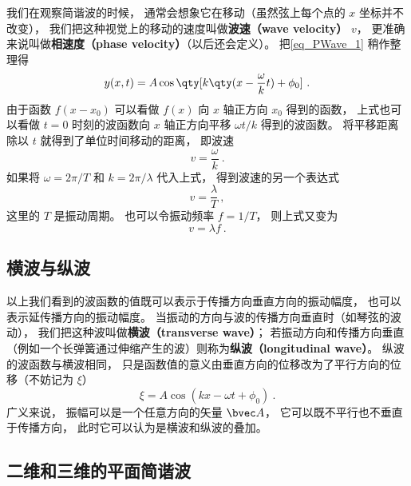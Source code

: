 我们在观察简谐波的时候， 通常会想象它在移动（虽然弦上每个点的 $x$ 坐标并不改变）， 我们把这种视觉上的移动的速度叫做\textbf{波速（wave velocity）} $v$， 更准确来说叫做\textbf{相速度（phase velocity）}（以后还会定义）。 把\autoref{eq_PWave_1} 稍作整理得
\begin{equation}
y(x, t) = A\cos \qty[k \qty(x - \frac{\omega}{k} t) + \phi_0]~.
\end{equation}
由于函数 $f(x - x_0)$ 可以看做 $f(x)$ 向 $x$ 轴正方向 $x_0$ 得到的函数， 上式也可以看做 $t = 0$ 时刻的波函数向 $x$ 轴正方向平移 $\omega t/k$ 得到的波函数。 将平移距离除以 $t$ 就得到了单位时间移动的距离， 即波速
\begin{equation}
v = \frac{\omega}{k}~.
\end{equation}
如果将 $\omega = 2\pi/T$ 和 $k = 2\pi/\lambda$ 代入上式， 得到波速的另一个表达式
\begin{equation}
v = \frac{\lambda}{T}~,
\end{equation}
这里的 $T$ 是振动周期。 也可以令振动频率 $f = 1/T$， 则上式又变为
\begin{equation}
v = \lambda f~.
\end{equation}

\subsection{横波与纵波}\label{sub_PWave_1}
以上我们看到的波函数的值既可以表示于传播方向垂直方向的振动幅度， 也可以表示延传播方向的振动幅度。 当振动的方向与波的传播方向垂直时（如琴弦的波动）， 我们把这种波叫做\textbf{横波（transverse wave）}； 若振动方向和传播方向垂直（例如一个长弹簧通过伸缩产生的波）则称为\textbf{纵波（longitudinal wave）}。 纵波的波函数与横波相同， 只是函数值的意义由垂直方向的位移改为了平行方向的位移（不妨记为 $\xi$）
\begin{equation}
\xi = A \cos(k x - \omega t + \phi_0)~.
\end{equation}
广义来说， 振幅可以是一个任意方向的矢量 $\bvec A$， 它可以既不平行也不垂直于传播方向， 此时它可以认为是横波和纵波的叠加。

\subsection{二维和三维的平面简谐波}

